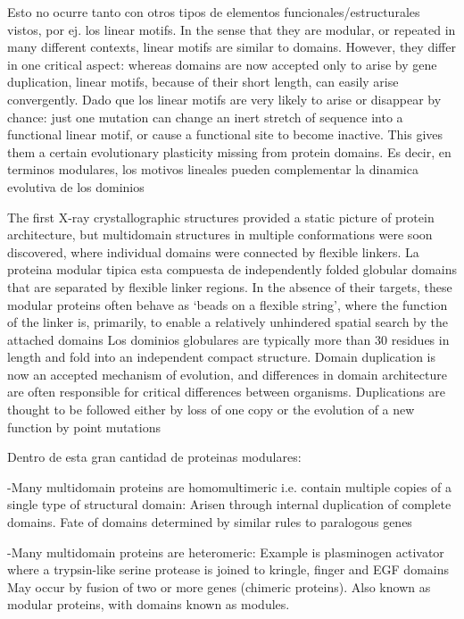 Esto no ocurre tanto con otros tipos de elementos funcionales/estructurales vistos, por ej. los linear motifs.
In the sense that they are modular, or repeated in many different contexts, linear motifs are similar to domains. 
However, they differ in one critical aspect: whereas domains are now accepted only to arise by gene duplication, linear motifs, because of their short length, can easily arise convergently.
Dado que los linear motifs are very likely to arise or disappear by chance: 
just one mutation can change an inert stretch of sequence into a functional linear motif, or cause a functional site to become inactive. 
This gives them a certain evolutionary plasticity missing from protein domains.
Es decir, en terminos modulares, los motivos lineales pueden complementar la dinamica evolutiva de los dominios

The first X-ray crystallographic structures provided a static picture of protein architecture, but multidomain structures in multiple conformations were soon discovered, where individual domains were connected by flexible linkers.
La proteina modular tipica esta compuesta de independently folded globular domains that are separated by flexible linker regions. 
In the absence of their targets, these modular proteins often behave as ‘beads on a flexible string’, where the function of the linker is, primarily, to enable a relatively unhindered spatial search by the attached domains
Los dominios globulares are typically more than 30 residues in length and fold into an independent compact structure. 
Domain duplication is now an accepted mechanism of evolution, and differences in domain architecture are often responsible for critical differences between organisms.
Duplications are thought to be followed either by loss of one copy or the evolution of a new function by point mutations


Dentro de esta gran cantidad de proteinas modulares:

-Many multidomain proteins are homomultimeric i.e. contain multiple copies of a single type of structural domain: Arisen through internal duplication of complete domains. Fate of domains determined by similar rules to paralogous genes

-Many multidomain proteins are heteromeric: Example is plasminogen activator where a trypsin-like serine protease is joined to kringle, finger and EGF domains
May occur by fusion of two or more genes (chimeric proteins). Also known as modular proteins, with domains known as modules. 

